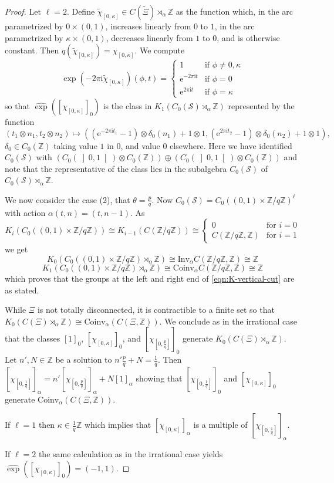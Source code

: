 \documentclass[11pt]{amsart}
\newcommand{\Z}{\mathbb{Z}}
\newcommand{\cut}{\kappa}
\newcommand{\Ss}{\mathcal{S}}
\newcommand{\p}{p}
\newcommand{\q}{q}
\begin{document}
\begin{proof}
Let $\ell=2$. Define $\tilde{\chi}_{[0, \cut]}\in C(\tilde{\Xi}) \rtimes_\alpha \mathbb{Z}$ as the function which, in the arc parametrized by $0 \times (0, 1)$, increases linearly from $0$ to $1$, in the arc parametrized by $\cut \times (0, 1)$, decreases linearly from $1$ to $0$, and is otherwise constant. Then $q(\tilde\chi_{[0, \cut]})={\chi}_{[0, \cut]}$.
We compute
$$	
		\exp(-2\pi\text{i}\tilde{\chi}_{[0, \cut]})(\phi,t)= \left\{
		\begin{array}{lll}
			1 & \mbox{if } \phi \ne 0, \cut \\
			\text{e}^{-2\pi \text{i}t} &\mbox{if } \phi=0\\ \text{e}^{2\pi \text{i}t} &\mbox{if } \phi=\cut
		\end{array} \right. $$
so that $\hat\exp([{\chi}_{[0, \cut]}]_0)$ is  the class in $K_1(C_0(\Ss)\rtimes_\alpha\Z)$ represented by the function
\begin{equation}\label{gamma_g3}	
(t_1\otimes n_1,t_2\otimes n_2)\mapsto ((\text{e}^{-2\pi \text{i}t_1}-1)\otimes \delta_0(n_1)+1\otimes1, (\text{e}^{2\pi \text{i}t_2}-1)\otimes \delta_0(n_2)+1\otimes1),
\end{equation}
 $\delta_0\in C_0(\Z)$ taking value $1$ in $0$, and value $0$ elsewhere. Here we have identified 
$C_0(\mathcal{S}) $ with 
$(C_0(\left]0,1\right[)\otimes C_0( \Z))\oplus (C_0(\left]0,1\right[)\otimes C_0( \Z))$ and note that the representative of the class lies in the subalgebra $C_0(\mathcal{S})$ of $C_0(\Ss)\rtimes_\alpha\Z$.

We now consider the case (2), that $\theta = \frac{\p}{\q}$.
Now $C_0(\Ss)=C_0((0,1)\times \Z/\q\Z)^\ell$ with action $\alpha(t,n) = (t,n-1)$. As 
$$K_i(C_0((0,1)\times \Z/\q\Z)) \cong K_{i-1}(C(\Z/\q\Z))\cong \left\{\begin{array}{ll} 0 & \mbox{for } i = 0 \\
C(\Z/\q\Z,\Z) & \mbox{for } i = 1 \end{array}\right.$$
we get 
$$K_0(C_0((0,1)\times \Z/\q\Z)\rtimes_\alpha \Z) \cong \mathrm{Inv}_\alpha C(\Z/\q\Z,\Z) \cong \Z$$ 
$$K_1(C_0((0,1)\times \Z/\q\Z)\rtimes_\alpha \Z) \cong \mathrm{Coinv}_\alpha C(\Z/\q\Z,\Z) \cong \Z$$
which proves that the groups at the left and right end of \eqref{eqn:K-vertical-cut} are as stated.

While $\Xi$ is not totally disconnected, it is contractible to a finite set so that  $K_0(C(\Xi) \rtimes_\alpha \mathbb{Z})\cong \mathrm{Coinv}_{\alpha}(C(\Xi,\Z))$. We conclude as in the irrational case that the classes $[1]_0$, $ [\chi_{[0,\cut]}]_0$, and $  [\chi_{[0,\frac{\p}{\q}]}]_0 $ generate $K_0(C(\Xi)\rtimes_\alpha\Z)$. Let $n',N\in\Z$ be a solution to $n'\frac{\p}{\q} + N = \frac{1}{\q}$. Then  $[\chi_{[0,\frac{1}{\q}]}]_\alpha   = n'  [\chi_{[0,\frac{\p}{\q}]}]_\alpha + N [1]_\alpha$ showing that $[\chi_{[0,\frac{1}{\q}]}]_0$ and  $[\chi_{[0,\cut]}]_0$ generate  $\mathrm{Coinv}_{\alpha}(C(\Xi,\Z))$.

If $\ell = 1$ then $\cut\in \frac1{\q}\Z$ which implies that   $[\chi_{[0,\cut]}]_\alpha$ is a multiple of $  [\chi_{[0,\frac1{\q}]}]_\alpha $. 

If $\ell=2$ the same calculation as in the irrational case yields $\hat\exp([\chi_{[0,\cut]}]_0) = (-1,1)$.
\end{proof}
\end{document}
